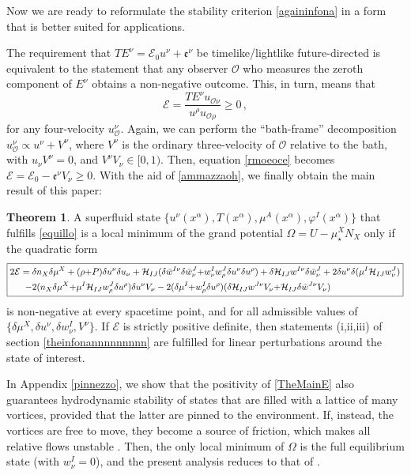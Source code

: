 \documentclass[a4paper, amsfonts, amssymb, amsmath, reprint, showkeys, nofootinbib, twoside,notitlepage,onecolumn]{revtex4-2}
\theoremstyle{definition}
\theoremstyle{theorem}
\newtheorem{theorem}{Theorem}
\theoremstyle{corollary}
\begin{document}
Now we are ready to reformulate the stability criterion \eqref{againinfona} in a form that is better suited for applications.

The requirement that $TE^\nu =\mathcal{E}_0 u^\nu +\mathfrak{e}^\nu$ be timelike/lightlike future-directed is equivalent to the statement that any observer $\mathcal{O}$ who measures the zeroth component of $E^\nu$  obtains a non-negative outcome. This, in turn, means that
\begin{equation}\label{rmoeoce}
\mathcal{E}= \dfrac{TE^\nu u_{\mathcal{O}\nu}}{u^\rho u_{\mathcal{O}\rho}} \geq 0 \, ,
\end{equation}
for any four-velocity $u^\nu_\mathcal{O}$. Again, we can perform the ``bath-frame'' decomposition $u_\mathcal{O}^\nu \propto u^\nu {+}V^\nu$, where $V^\nu$ is the ordinary three-velocity of $\mathcal{O}$ relative to the bath, with $u_\nu V^\nu=0$, and $V^\nu V_\nu \in [0,1)$. Then, equation \eqref{rmoeoce} becomes $\mathcal{E}=\mathcal{E}_0-\mathfrak{e}^\nu V_\nu \geq 0$. With the aid of \eqref{ammazzaoh}, we finally obtain the main result of this paper:
{\color{black}
\begin{theorem}\label{theo1}
A superfluid state $\{u^\nu (x^\alpha),T(x^\alpha),\mu^A(x^\alpha),\varphi^I(x^\alpha)\}$ that fulfills \eqref{equillo} is a local minimum of the grand potential $\Omega =U-\mu_\star^X N_X$ only if the quadratic form 
\begin{equation}\label{TheMainE}
\boxed{
\begin{aligned}
2\mathcal{E}={}&  \delta n_X \delta \mu^X +(\rho{+}P)\delta u^\nu \delta u_\nu +\mathcal{H}_{IJ}( \delta \Bar{w}^{I\nu}\delta\Bar{w}^J_\nu {+} w^I_\nu  w^J_\rho \delta u^\nu \delta u^\rho) +\delta \mathcal{H}_{IJ} w^{I\nu}\delta \Bar{w}^J_\nu +2 \delta u^\nu \delta (\mu^I \mathcal{H}_{IJ} w^J_\nu) \\
-{}& 2(n_X \delta \mu^X {+}\mu^I \mathcal{H}_{IJ}w^J_\rho \delta u^\rho)\delta u^\nu V_\nu -2(\delta \mu^I {+}w^I_\rho \delta u^\rho)(\delta \mathcal{H}_{IJ} w^{J\nu} V_\nu{+}\mathcal{H}_{IJ}\delta \Bar{w}^{J\nu} V_\nu) \\
\end{aligned}
}
\end{equation}
is non-negative at every spacetime point, and for all admissible values of $\{\delta \mu^X,\delta u^\nu,\delta w^I_\nu,V^\nu \}$. If $\mathcal{E}$ is strictly positive definite, then statements \textup{(i,ii,iii)} of section \ref{theinfonannnnnnnnn} are fulfilled for linear perturbations around the state of interest.
\end{theorem}}
In Appendix \ref{pinnezzo}, we show that the positivity of \eqref{TheMainE} also guarantees hydrodynamic stability of states that are filled with a lattice of many vortices, provided that the latter are pinned to the environment. If, instead, the vortices are free to move, they become a source of friction, which makes all relative flows unstable \cite{langlois98,GavassinoIordanskii2021}. Then, the only local minimum of $\Omega$ is the full equilibrium state (with $w^I_\nu =0$), and the present analysis reduces to that of \cite{GavassinoStabilityCarter2022}. 
\end{document}
